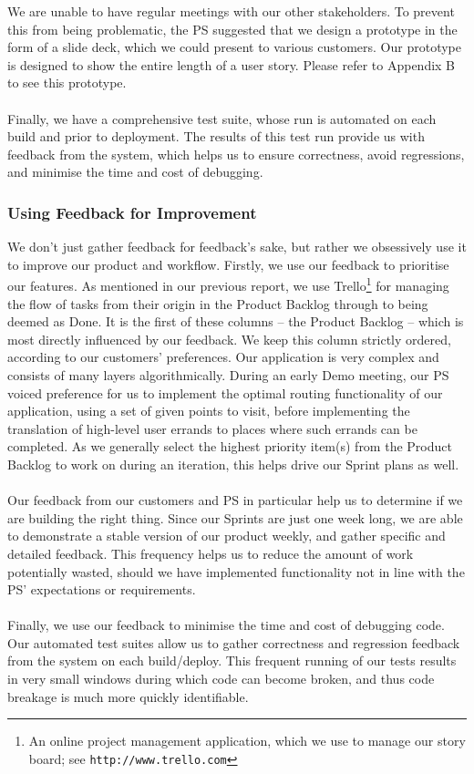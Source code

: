 \documentclass[a4paper, 10pt]{article}
\begin{document}
We are unable to have regular meetings with our other stakeholders. To prevent this from being problematic, the PS suggested that we design a prototype in the form of a slide deck, which we could present to various customers. Our prototype is designed to show the entire length of a user story. Please refer to Appendix B to see this prototype.\\\\
Finally, we have a comprehensive test suite, whose run is automated on each build and prior to deployment. The results of this test run provide us with feedback from the system, which helps us to ensure correctness, avoid regressions, and minimise the time and cost of debugging.
\subsubsection{Using Feedback for Improvement}
We don't just gather feedback for feedback's sake, but rather we obsessively use it to improve our product and workflow. Firstly, we use our feedback to prioritise our features. As mentioned in our previous report, we use Trello\footnote{An online project management application, which we use to manage our story board; see \texttt{http://www.trello.com}} for managing the flow of tasks from their origin in the Product Backlog through to being deemed as Done. It is the first of these columns -- the Product Backlog -- which is most directly influenced by our feedback. We keep this column strictly ordered, according to our customers' preferences. Our application is very complex and consists of many layers algorithmically. During an early Demo meeting, our PS voiced preference for us to implement the optimal routing functionality of our application, using a set of given points to visit, before implementing the translation of high-level user errands to places where such errands can be completed. As we generally select the highest priority item(s) from the Product Backlog to work on during an iteration, this helps drive our Sprint plans as well.
\\\\
Our feedback from our customers and PS in particular help us to determine if we are building the right thing. Since our Sprints are just one week long, we are able to demonstrate a stable version of our product weekly, and gather specific and detailed feedback. This frequency helps us to reduce the amount of work potentially wasted, should we have implemented functionality not in line with the PS' expectations or requirements.
\\\\
Finally, we use our feedback to minimise the time and cost of debugging code. Our automated test suites allow us to gather correctness and regression feedback from the system on each build/deploy. This frequent running of our tests results in very small windows during which code can become broken, and thus code breakage is much more quickly identifiable.
\end{document}
